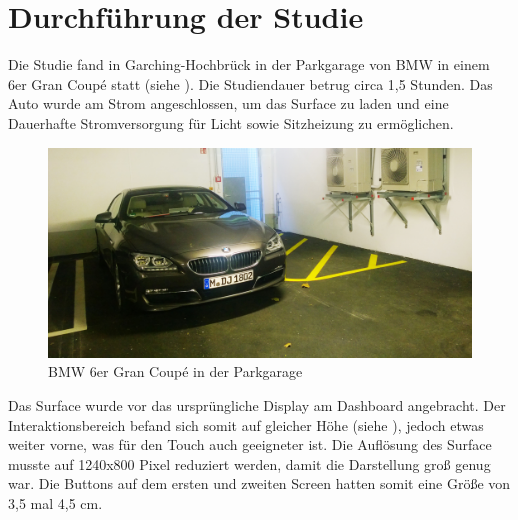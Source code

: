 \section{Durchführung der Studie}
Die Studie fand in Garching-Hochbrück in der Parkgarage von BMW in einem 6er Gran Coupé statt (siehe ). 
Die Studiendauer betrug circa 1,5 Stunden. 
Das Auto wurde am Strom angeschlossen, um das Surface zu laden und eine Dauerhafte Stromversorgung für Licht sowie Sitzheizung zu ermöglichen.
\begin{figure}[ht]
  \centering
  \includegraphics[width=1\textwidth]{img/GranCoupe.jpg}
  \caption{BMW 6er Gran Coupé in der Parkgarage}
  \label{fig:GranCoupe}
\end{figure} 
Das Surface wurde vor das ursprüngliche Display am Dashboard angebracht. 
Der Interaktionsbereich befand sich somit auf gleicher Höhe (siehe ), jedoch etwas weiter vorne, was für den Touch auch geeigneter ist. 
Die Auflösung des Surface musste auf 1240x800 Pixel reduziert werden, damit die Darstellung groß genug war. 
Die Buttons auf dem ersten und zweiten Screen hatten somit eine Größe von 3,5 mal 4,5 cm. 

